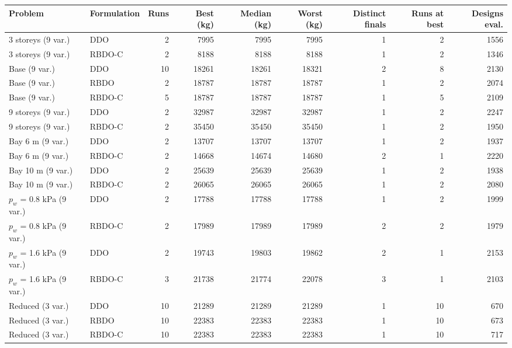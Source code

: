 \begin{tabular}{llrrrrrrr}
\toprule
Problem & Formulation & Runs & Best (kg) & Median (kg) & Worst (kg) & Distinct finals & Runs at best & Designs eval. \\
\midrule
3 storeys (9 var.) & DDO & 2 & 7995 & 7995 & 7995 & 1 & 2 & 1556 \\
3 storeys (9 var.) & RBDO-C & 2 & 8188 & 8188 & 8188 & 1 & 2 & 1346 \\
Base (9 var.) & DDO & 10 & 18261 & 18261 & 18321 & 2 & 8 & 2130 \\
Base (9 var.) & RBDO & 2 & 18787 & 18787 & 18787 & 1 & 2 & 2074 \\
Base (9 var.) & RBDO-C & 5 & 18787 & 18787 & 18787 & 1 & 5 & 2109 \\
9 storeys (9 var.) & DDO & 2 & 32987 & 32987 & 32987 & 1 & 2 & 2247 \\
9 storeys (9 var.) & RBDO-C & 2 & 35450 & 35450 & 35450 & 1 & 2 & 1950 \\
Bay 6 m (9 var.) & DDO & 2 & 13707 & 13707 & 13707 & 1 & 2 & 1937 \\
Bay 6 m (9 var.) & RBDO-C & 2 & 14668 & 14674 & 14680 & 2 & 1 & 2220 \\
Bay 10 m (9 var.) & DDO & 2 & 25639 & 25639 & 25639 & 1 & 2 & 1938 \\
Bay 10 m (9 var.) & RBDO-C & 2 & 26065 & 26065 & 26065 & 1 & 2 & 2080 \\
$p_w$ = 0.8 kPa (9 var.) & DDO & 2 & 17788 & 17788 & 17788 & 1 & 2 & 1999 \\
$p_w$ = 0.8 kPa (9 var.) & RBDO-C & 2 & 17989 & 17989 & 17989 & 2 & 2 & 1979 \\
$p_w$ = 1.6 kPa (9 var.) & DDO & 2 & 19743 & 19803 & 19862 & 2 & 1 & 2153 \\
$p_w$ = 1.6 kPa (9 var.) & RBDO-C & 3 & 21738 & 21774 & 22078 & 3 & 1 & 2103 \\
Reduced (3 var.) & DDO & 10 & 21289 & 21289 & 21289 & 1 & 10 & 670 \\
Reduced (3 var.) & RBDO & 10 & 22383 & 22383 & 22383 & 1 & 10 & 673 \\
Reduced (3 var.) & RBDO-C & 10 & 22383 & 22383 & 22383 & 1 & 10 & 717 \\
\bottomrule
\end{tabular}
